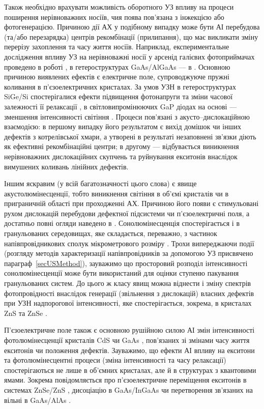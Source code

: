 Також необхідно врахувати можливість оборотного УЗ впливу на процеси поширення нерівноважних носіїв, чия поява пов'язана з інжекцією або фотогенерацією.
Причиною дії АХ у подібному випадку може  бути АІ перебудова (та/або перезарядка)  центрів рекомбінації (прилипання), що має викликати зміну перерізу захоплення та часу життя носіїв.
Наприклад, експериментальне дослідження впливу УЗ на нерівноважні носії у арсенід галієвих фотоприймачах проведено в роботі \cite{Zaveryukhin2002:2}, в гетероструктурах GaAs/AlGaAs --- в \cite{Olikh:Visn2007}.
Основною причиною виявлених ефектів є електричне поле, супроводжуюче пружні коливання в п'єзоелектричних кристалах.
За умов УЗН в гетероструктурах SiGe/Si спостерігалися ефекти підвищення фотонапруги та зміни часової залежності її релаксації  \cite{Ostrovskii2001,Kuryliuk2009},
в світловипромінюючих GaP  діодах на основі --- зменшення інтенсивності світіння \cite{USL:GaP}.
Процеси пов'язані з акусто--дислокаційною взаємодією:
в першому випадку його результатом є вихід домішок чи інших дефектів з котрелівської хмари, а утворені в результаті незаповнені зв'язки діють як ефективні рекомбінаційні центри;
в другому --- відбувається виникнення нерівноважних дислокаційних скупчень та руйнування екситонів внаслідок вимушених коливань лінійних дефектів.

Іншим яскравим (у всій багатозначності цього слова) є явище акустолюмінесценції, тобто виникнення світіння в об'ємі  кристалів чи в приграничній області при проходженні АХ.
Причиною його появи є стимульовані рухом дислокацій перебудови дефектної підсистеми чи п'єзоелектричні поля,
а достатньо повні огляди наведено в \cite{OstrBook,OSTROVSKII1999}.
Сонолюмінесценція спостерігається і в гранульованих середовищах, яке складається, переважно, з частинок напівпровідникових сполук мікрометрового розміру \cite{KorotRep}.
Трохи випереджаючи події (розгляду методів характеризації напівпровідників за допомогою УЗ присвячено параграф~\ref{secUSMethod}),
зауважимо що просторовий розподіл інтенсивності сонолюмінесценції може бути використаний для оцінки ступеню пакування гранульованих систем\cite{KorotZnSdens}.
До цього ж класу явищ можна віднести і зміну спектрів фотопровідності внаслідок генерації (звільнення з дислокацій) власних дефектів при УЗН надпорогової інтенсивності, яке спостерігається, зокрема, в кристалах ZnS та ZnSe \cite{OSTROVSKII1992,OSTROVSKII1999}.

П'єзоелектричне поле також є основною рушійною силою АІ змін інтенсивності фотолюмінесценції кристалів CdS \cite{KOROTCHENKOV1998,KorotchenAPL1998} чи GaAs \cite{Zhuravlev}, пов'язаних зі змінами часу життя екситонів чи положення дефектів.
Зауважимо, що ефекти АІ впливу на екситони та фотолюмінесцентні процеси (зміна інтенсивності та часу релаксації) спостерігаються не лише в об'ємних кристалах, але й в структурах з квантовими ямами.
Зокрема повідомляється про п'єзоелектричне переміщення екситонів в системах ZnSe/ZnS \cite{KorotAPL1999,Ostrovskii2001},
дисоціацію в GaAs/InGaAs \cite{PhysRevLett78} чи перетворення зв'язаних на вільні в GaAs/AlAs \cite{PhysRevB80:165307}.

